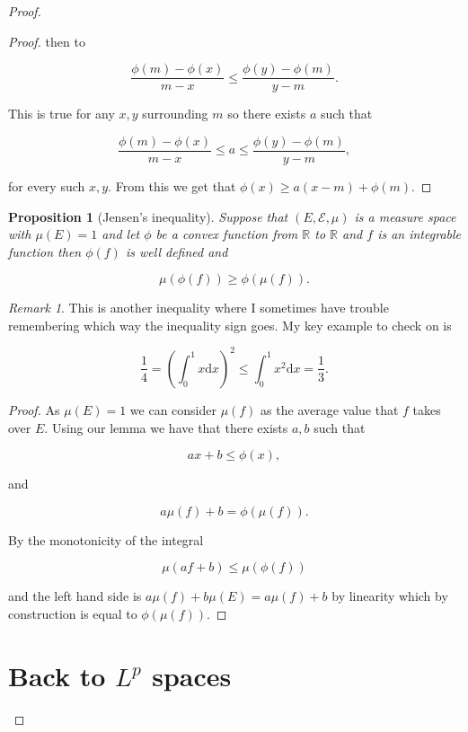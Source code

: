 \documentclass[
]{book}
\newtheorem{proposition}{Proposition}[chapter]
\theoremstyle{definition}
\theoremstyle{definition}
\theoremstyle{definition}
\theoremstyle{definition}
\theoremstyle{remark}
\newtheorem*{remark}{Remark}
\begin{document}
\begin{proof}
\begin{proof}
then to

\[ \frac{\phi(m)-\phi(x)}{m-x} \leq \frac{\phi(y)-\phi(m)}{y-m}. \]

This is true for any \(x,y\) surrounding \(m\) so there exists \(a\) such that

\[  \frac{\phi(m)-\phi(x)}{m-x} \leq a \leq \frac{\phi(y)-\phi(m)}{y-m}, \]

for every such \(x,y\). From this we get that \(\phi(x) \geq a(x-m) + \phi(m)\).
\end{proof}

\begin{proposition}[Jensen's inequality]
Suppose that \((E, \mathcal{E}, \mu)\) is a measure space with \(\mu(E) = 1\) and let \(\phi\) be a convex function from \(\mathbb{R}\) to \(\mathbb{R}\) and \(f\) is an integrable function then \(\phi(f)\) is well defined and

\[ \mu(\phi(f)) \geq \phi(\mu(f)). \]
\end{proposition}

\begin{remark}
This is another inequality where I sometimes have trouble remembering which way the inequality sign goes. My key example to check on is

\[\frac{1}{4} = \left( \int_0^1 x \mathrm{d}x \right)^2 \leq \int_0^1 x^2 \mathrm{d}x = \frac{1}{3}. \]
\end{remark}

\begin{proof}
As \(\mu(E)=1\) we can consider \(\mu(f)\) as the average value that \(f\) takes over \(E\). Using our lemma we have that there exists \(a,b\) such that

\[ ax+b \leq \phi(x), \]

and

\[a\mu(f)+b = \phi(\mu(f)).\]

By the monotonicity of the integral

\[ \mu(af + b) \leq \mu(\phi(f)) \]

and the left hand side is \(a \mu(f) +b \mu(E)= a \mu(f) +b\) by linearity which by construction is equal to \(\phi(\mu(f))\).
\end{proof}

\hypertarget{back-to-lp-spaces}{%
\section{\texorpdfstring{Back to \(L^p\) spaces}{Back to L\^{}p spaces}}\label{back-to-lp-spaces}}


\end{proof}
\end{document}
